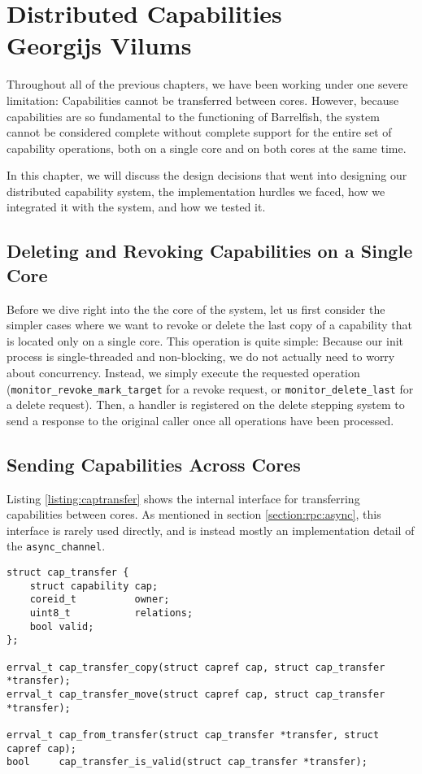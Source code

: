 \chapter[Distributed Capabilities]{Distributed Capabilities \\ \Large \textnormal{Georgijs Vilums}}

\label{chapter:distcap}

Throughout all of the previous chapters, we have been working under one severe limitation: Capabilities cannot be transferred between cores. However, because capabilities are so fundamental to the functioning of Barrelfish, the system cannot be considered complete without complete support for the entire set of capability operations, both on a single core and on both cores at the same time.

In this chapter, we will discuss the design decisions that went into designing our distributed capability system, the implementation hurdles we faced, how we integrated it with the system, and how we tested it.

\section{Deleting and Revoking Capabilities on a Single Core}
\label{section:distcap:dellocal}
Before we dive right into the the core of the system, let us first consider the simpler cases where we want to revoke or delete the last copy of a capability that is located only on a single core. This operation is quite simple: Because our init process is single-threaded and non-blocking, we do not actually need to worry about concurrency. Instead, we simply execute the requested operation (\texttt{monitor\_revoke\_mark\_target} for a revoke request, or \texttt{monitor\_delete\_last} for a delete request). Then, a handler is registered on the delete stepping system to send a response to the original caller once all operations have been processed.

\section{Sending Capabilities Across Cores}
Listing \ref{listing:captransfer} shows the internal interface for transferring capabilities between cores. As mentioned in section \ref{section:rpc:async}, this interface is rarely used directly, and is instead mostly an implementation detail of the \texttt{async\_channel}.

\begin{lstlisting}[caption={Internal interface for cross-core capability tranfers},label={listing:captransfer}]
struct cap_transfer {
    struct capability cap;
    coreid_t          owner;
    uint8_t           relations;
    bool valid;
};

errval_t cap_transfer_copy(struct capref cap, struct cap_transfer *transfer);
errval_t cap_transfer_move(struct capref cap, struct cap_transfer *transfer);

errval_t cap_from_transfer(struct cap_transfer *transfer, struct capref cap);
bool     cap_transfer_is_valid(struct cap_transfer *transfer);
\end{lstlisting}

